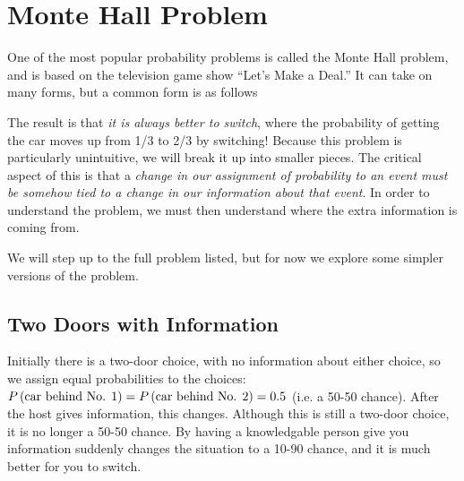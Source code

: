 \section{Monte Hall Problem}\label{sec:monty}
One of the most popular probability problems is called the Monte Hall problem, and is based on the television game show ``Let's Make a Deal.''\cite{selvin1975problem}  It can take on many forms, but a common form is as follows\cite{vos1990ask}


The result is that {\em it is always better to switch}, where the probability of getting the car moves up from 1/3 to 2/3 by switching!
Because this problem is particularly unintuitive, we will break it up into smaller pieces.   The critical aspect of this is that a {\em change in our assignment of probability to an event must be somehow tied to a change in our information about that event}.  In order to understand the problem, we must then understand where the extra information is coming from.

We will step up to the full problem listed, but for now we explore some simpler versions of the problem.
\subsection{Two Doors with Information}


Initially there is a two-door choice, with no information about either choice, so we assign equal probabilities to the choices:  $\P{car behind No. 1}=\P{car behind No. 2}=0.5$ (i.e. a 50-50 chance).  After the host gives information, this changes.  Although this is still a two-door choice, it is no longer a 50-50 chance.  By having a knowledgable person give you information suddenly changes the situation to a 10-90 chance, and it is much better for you to switch.

